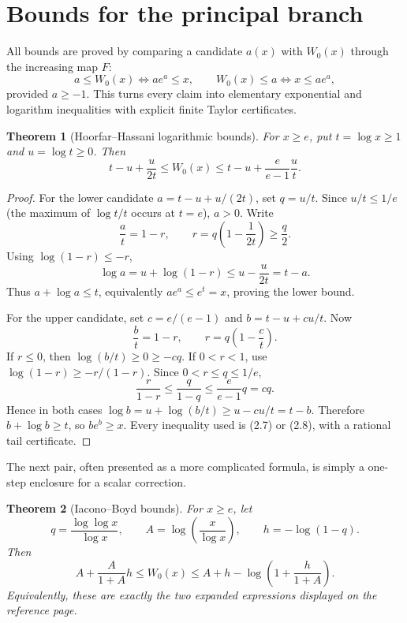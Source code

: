 \documentclass[11pt]{article}
\newtheorem{theorem}{Theorem}[section]
\theoremstyle{definition}
\begin{document}
\section{Bounds for the principal branch}\label{sec:bounds-principal}

All bounds are proved by comparing a candidate \(a(x)\) with \(W_0(x)\)
through the increasing map \(F\):
\[
 a\le W_0(x)\iff a e^a\le x,
 \qquad
 W_0(x)\le a\iff x\le a e^a,
 \tag{11.1}
\]
provided \(a\ge-1\).  This turns every claim into elementary exponential and
logarithm inequalities with explicit finite Taylor certificates.

\begin{theorem}[Hoorfar--Hassani logarithmic bounds]\label{thm:HH}
For \(x\ge e\), put \(t=\log x\ge1\) and \(u=\log t\ge0\).  Then
\[
 t-u+\frac{u}{2t}
 \le W_0(x)
 \le t-u+\frac{e}{e-1}\frac{u}{t}.
 \tag{11.2}
\]
\end{theorem}

\begin{proof}
For the lower candidate
\(a=t-u+u/(2t)\), set \(q=u/t\).  Since
\(u/t\le1/e\) (the maximum of \(\log t/t\) occurs at \(t=e\)),
\(a>0\).  Write
\[
 \frac{a}{t}=1-r,
 \qquad r=q\left(1-\frac1{2t}\right)\ge\frac q2.
\]
Using \(\log(1-r)\le-r\),
\[
 \log a=u+\log(1-r)\le u-\frac{u}{2t}=t-a.
\]
Thus \(a+\log a\le t\), equivalently \(ae^a\le e^t=x\), proving the lower
bound.

For the upper candidate, set \(c=e/(e-1)\) and
\(b=t-u+cu/t\).  Now
\[
 \frac bt=1-r,
 \qquad r=q\left(1-\frac ct\right).
\]
If \(r\le0\), then \(\log(b/t)\ge0\ge-cq\).  If \(0<r<1\), use
\(\log(1-r)\ge-r/(1-r)\).  Since \(0<r\le q\le1/e\),
\[
 \frac{r}{1-r}\le\frac{q}{1-q}\le\frac{e}{e-1}q=cq.
\]
Hence in both cases
\(\log b=u+\log(b/t)\ge u-cu/t=t-b\).  Therefore
\(b+\log b\ge t\), so \(be^b\ge x\).  Every inequality used is (2.7) or
(2.8), with a rational tail certificate.
\end{proof}

The next pair, often presented as a more complicated formula, is simply a
one-step enclosure for a scalar correction.

\begin{theorem}[Iacono--Boyd bounds]\label{thm:IB}
For \(x\ge e\), let
\[
 q=\frac{\log\log x}{\log x},\qquad
 A=\log\left(\frac{x}{\log x}\right),
 \qquad h=-\log(1-q).
\]
Then
\[
 A+\frac{A}{1+A}h\le W_0(x)
 \le A+h-\log\left(1+\frac{h}{1+A}\right).
 \tag{11.3}
\]
Equivalently, these are exactly the two expanded expressions displayed on the
reference page.
\end{theorem}
\end{document}
